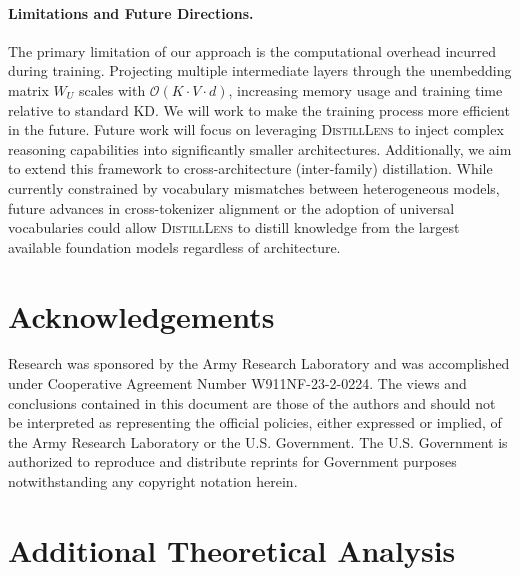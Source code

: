\documentclass{article}
\theoremstyle{plain}
\theoremstyle{definition}
\theoremstyle{remark}
\begin{document}
\paragraph{Limitations and Future Directions.}
The primary limitation of our approach is the computational overhead incurred during training. Projecting multiple intermediate layers through the unembedding matrix $W_U$ scales with $\mathcal{O}(K \cdot V \cdot d)$, increasing memory usage and training time relative to standard KD.
We will work to make the training process more efficient in the future.
Future work will focus on leveraging \textsc{DistillLens} to inject complex reasoning capabilities into significantly smaller architectures. Additionally, we aim to extend this framework to cross-architecture (inter-family) distillation. While currently constrained by vocabulary mismatches between heterogeneous models, future advances in cross-tokenizer alignment or the adoption of universal vocabularies could allow \textsc{DistillLens} to distill knowledge from the largest available foundation models regardless of architecture.

\section*{Acknowledgements}
Research was sponsored by the Army Research Laboratory and was accomplished under Cooperative Agreement Number W911NF-23-2-0224. The views and conclusions contained in this document are those of the authors and should not be interpreted as representing the official policies, either expressed or implied, of the Army Research Laboratory or the U.S. Government. The U.S. Government is authorized to reproduce and distribute reprints for Government purposes notwithstanding any copyright notation herein.




\newpage
\appendix
\onecolumn

\section{Additional Theoretical Analysis}
\end{document}
